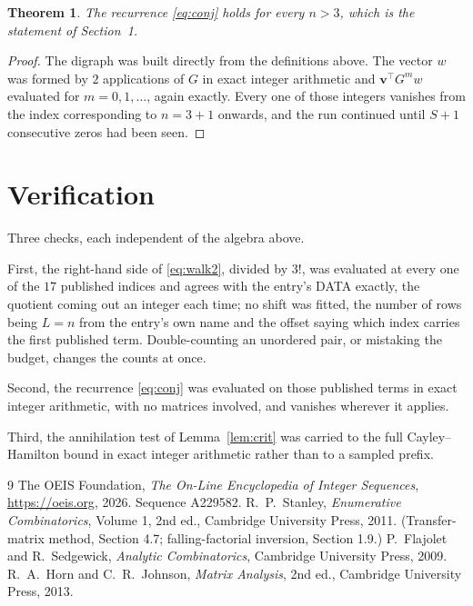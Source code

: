 \documentclass[11pt,a4paper]{article}
\theoremstyle{plain}
\newtheorem{theorem}{Theorem}
\theoremstyle{definition}
\begin{document}
\begin{theorem}
The recurrence \eqref{eq:conj} holds for every $n>3$, which is the statement of
Section~1.
\end{theorem}

\begin{proof}
The digraph was built directly from the definitions above. The vector $w$ was formed by
$2$ applications of $G$ in exact integer arithmetic and $\mathbf{v}^{\!\top}G^{m}w$
evaluated for $m=0,1,\dots$, again exactly. Every one of those integers vanishes from the
index corresponding to $n=3+1$ onwards, and the run continued until $S+1$ consecutive
zeros had been seen.
\end{proof}

\section{Verification}

Three checks, each independent of the algebra above.

First, the right-hand side of \eqref{eq:walk2}, divided by $3!$, was evaluated at every
one of the $17$ published indices and agrees with the entry's DATA exactly, the quotient
coming out an integer each time; no shift was fitted, the number of rows being $L=n$
from the entry's own name and the offset saying which index carries the first published term.
Double-counting an unordered pair, or mistaking the budget, changes the counts at once.

Second, the recurrence \eqref{eq:conj} was evaluated on those published terms in exact
integer arithmetic, with no matrices involved, and vanishes wherever it applies.

Third, the annihilation test of Lemma~\ref{lem:crit} was carried to the full
Cayley--Hamilton bound in exact integer arithmetic rather than to a sampled prefix.

\begin{thebibliography}{9}
 The OEIS Foundation, \emph{The On-Line Encyclopedia of Integer
Sequences}, \url{https://oeis.org}, 2026. Sequence A229582.
 R.~P.~Stanley, \emph{Enumerative Combinatorics}, Volume 1, 2nd ed.,
Cambridge University Press, 2011. (Transfer-matrix method, Section 4.7; falling-factorial
inversion, Section 1.9.)
 P.~Flajolet and R.~Sedgewick, \emph{Analytic Combinatorics}, Cambridge
University Press, 2009.
 R.~A.~Horn and C.~R.~Johnson, \emph{Matrix Analysis}, 2nd ed., Cambridge
University Press, 2013.
\end{thebibliography}
\end{document}
